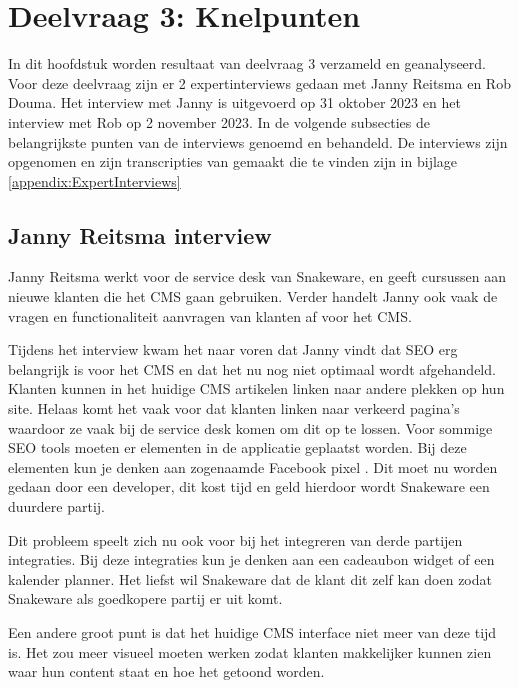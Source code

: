 \section{Deelvraag 3: Knelpunten}
In dit hoofdstuk worden resultaat van deelvraag 3 \qw{\textit{\SubquestionThree}} verzameld en geanalyseerd.
Voor deze deelvraag zijn er 2 expertinterviews gedaan met Janny Reitsma en Rob Douma.
Het interview met Janny is uitgevoerd op 31 oktober 2023 en het interview met Rob op 2 november 2023.
In de volgende subsecties de belangrijkste punten van de interviews genoemd en behandeld.
De interviews zijn opgenomen en zijn transcripties van gemaakt die te vinden zijn in bijlage \ref{appendix:ExpertInterviews}

\subsection{Janny Reitsma interview}
\label{sec:JannyInterview}
Janny Reitsma werkt voor de service desk van Snakeware, en geeft cursussen aan nieuwe klanten die het CMS gaan gebruiken.
Verder handelt Janny ook vaak de vragen en functionaliteit aanvragen van klanten af voor het CMS.

\whitespace
Tijdens het interview kwam het naar voren dat Janny vindt dat \gls{SEO} erg belangrijk is voor het CMS en dat het nu nog niet optimaal wordt afgehandeld.
Klanten kunnen in het huidige CMS artikelen linken naar andere plekken op hun site.
Helaas komt het vaak voor dat klanten linken naar verkeerd pagina's waardoor ze vaak bij de service desk komen om dit op te lossen.
Voor sommige \gls{SEO} tools moeten er elementen in de applicatie geplaatst worden.
Bij deze elementen kun je denken aan zogenaamde Facebook pixel \Parencite{FacebookPixel}.
Dit moet nu worden gedaan door een developer, dit kost tijd en geld hierdoor wordt Snakeware een duurdere partij.

\whitespace
Dit probleem speelt zich nu ook voor bij het integreren van derde partijen integraties.
Bij deze integraties kun je denken aan een cadeaubon widget of een kalender planner.
Het liefst wil Snakeware dat de klant dit zelf kan doen zodat Snakeware als goedkopere partij er uit komt.

\whitespace
Een andere groot punt is dat het huidige CMS interface niet meer van deze tijd is.
Het zou meer visueel moeten werken zodat klanten makkelijker kunnen zien waar hun content staat en hoe het getoond worden.

